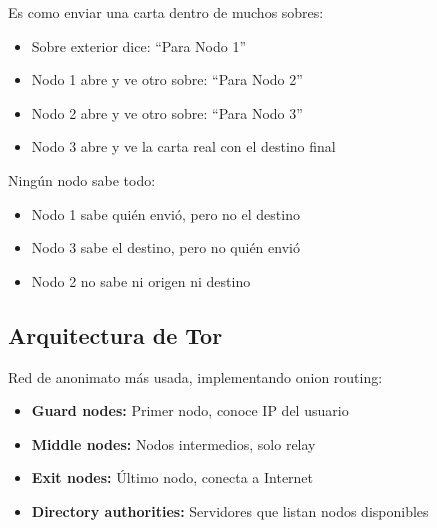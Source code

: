 \documentclass[11pt,a4paper,twoside]{book}
\begin{document}
\begin{intuicion}
Es como enviar una carta dentro de muchos sobres:
\begin{itemize}
    \item Sobre exterior dice: ``Para Nodo 1''
    \item Nodo 1 abre y ve otro sobre: ``Para Nodo 2''
    \item Nodo 2 abre y ve otro sobre: ``Para Nodo 3''
    \item Nodo 3 abre y ve la carta real con el destino final
\end{itemize}

Ning\'un nodo sabe todo:
\begin{itemize}
    \item Nodo 1 sabe qui\'en envi\'o, pero no el destino
    \item Nodo 3 sabe el destino, pero no qui\'en envi\'o
    \item Nodo 2 no sabe ni origen ni destino
\end{itemize}
\end{intuicion}

\subsection{Arquitectura de Tor}

\begin{definition}
Red de anonimato m\'as usada, implementando onion routing:
\begin{itemize}
    \item \textbf{Guard nodes:} Primer nodo, conoce IP del usuario
    \item \textbf{Middle nodes:} Nodos intermedios, solo relay
    \item \textbf{Exit nodes:} \'Ultimo nodo, conecta a Internet
    \item \textbf{Directory authorities:} Servidores que listan nodos disponibles
\end{itemize}
\end{definition}
\end{document}
